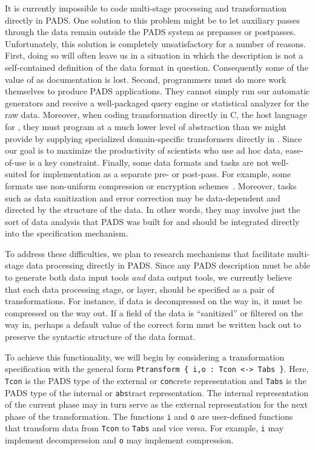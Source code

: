 It is currently impossible to code multi-stage processing and transformation
directly in PADS.  One solution
to this problem might be to let auxiliary passes through the data
remain outside the PADS system as prepasses or postpasses.  
Unfortunately, this solution is completely unsatisfactory for a
number of reasons.  First, doing so
will often leave us in a situation in which the \pads{} description 
is not a self-contained
definition of the data format in question.  Consequently some of the value
of \pads{} as documentation is lost.  
Second, programmers must do
more work themselves to produce PADS applications.  They cannot
simply run our automatic generators and receive a well-packaged 
query engine or statistical analyzer for the raw data.
Moreover, when coding transformation directly in C, the host language
for \pads{}, they must program at a much lower level of abstraction
than we might provide by supplying specialized domain-specific
transformers directly in \pads.
Since our goal is to maximize the productivity of scientists 
who use ad hoc data, ease-of-use is a key constraint.
Finally, some data formats and
tasks are not well-suited for implementation as a separate pre- or post-pass.
For example, some formats use non-uniform compression or encryption 
schemes~\cite{korn+:delta,korn+:data-format}.
Moreover, tasks such as data sanitization and error correction may be
data-dependent and directed by the structure of the data.  In other words,
they may involve just the sort of data analysis that PADS was built for
and should be integrated directly into the specification mechanism.

To address these difficulties,
we plan to research mechanisms that facilitate multi-stage data processing 
directly in PADS.  Since any PADS description must be able to generate 
both data
input tools {\em and} data output tools, we currently believe that each
data processing stage, or layer, should be specified as a pair of
transformations.  For instance, if data is decompressed on the way in,
it must be compressed on the way out.  If a field of the data is ``sanitized''
or filtered on the way in, perhaps a default value of the correct form must
be written back out to preserve the syntactic structure of the data format.

To achieve this functionality, we will begin by considering a
transformation specification with the general form 
\texttt{Ptransform \{ i,o :  Tcon <-> Tabs \}}.
Here, {\tt Tcon} is the PADS type of the external or {\tt con}crete
representation and {\tt Tabs} is the PADS type of the internal or 
{\tt abs}tract representation.  The internal representation of the current
phase may in turn serve as the external representation for the next
phase of the transformation.  The functions {\tt i} and {\tt o} are
user-defined functions that transform data from {\tt Tcon} to 
{\tt Tabs} and vice versa.  For example, {\tt i} may implement
decompression and {\tt o} may implement compression.

